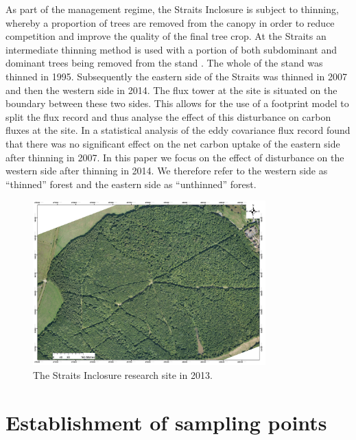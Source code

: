 \documentclass[11pt]{article}
\begin{document}
As part of the management regime, the Straits Inclosure is subject to thinning, whereby a proportion of trees are removed from the canopy in order to reduce competition and improve the quality of the final tree crop. At the Straits an intermediate thinning method is used with a portion of both subdominant and dominant trees being removed from the stand \citep{kerr2011thinning}. The whole of the stand was thinned in 1995. Subsequently the eastern side of the Straits was thinned in 2007 and then the western side in 2014. The flux tower at the site is situated on the boundary between these two sides. This allows for the use of a footprint model to split the flux record and thus analyse the effect of this disturbance on carbon fluxes at the site. In \citet{wilkinson2015effects} a statistical analysis of the eddy covariance flux record found that there was no significant effect on the net carbon uptake of the eastern side after thinning in 2007. In this paper we focus on the effect of disturbance on the western side after thinning in 2014. We therefore refer to the western side as ``thinned'' forest and the eastern side as ``unthinned'' forest.   


\begin{figure}[ht]
    \centering
    \includegraphics[width=0.8\textwidth]{AP1_2013.jpg}
    \caption{The Straits Inclosure research site in 2013.} \label{fig:ah_aerial_photo}
\end{figure}

\section{Establishment of sampling points}
\end{document}
